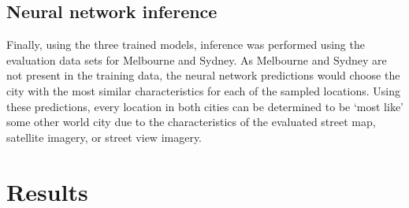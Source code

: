 \documentclass[10pt,letterpaper]{article}
\begin{document}
%
%
%
%
%



\subsection*{Neural network inference}\label{sec:methods5}    
Finally, using the three trained models, inference was performed using the evaluation data sets for Melbourne and Sydney. As Melbourne and Sydney are not present in the training data, the neural network predictions would choose the city with the most similar characteristics for each of the sampled locations. Using these predictions, every location in both cities can be determined to be `most like' some other world city due to the characteristics of the evaluated street map, satellite imagery, or street view imagery.

\section*{Results}\label{sec:results}
\end{document}
